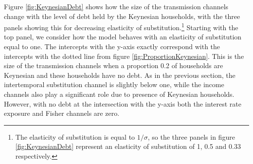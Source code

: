 \documentclass[12pt,a4paper]{article}
\begin{document}
Figure \ref{fig:KeynesianDebt} shows how the size of the transmission channels change with the level of debt held by the Keynesian households, with the three panels showing this for decreasing elasticity of substitution.\footnote{The elasticity of substitution is equal to $1/\sigma$, so the three panels in figure \ref{fig:KeynesianDebt} represent an elasticity of substitution of 1, 0.5 and 0.33 respectively.} Starting with the top panel, we consider how the model behaves with an elasticity of substitution equal to one. The intercepts with the y-axis exactly correspond with the intercepts with the dotted line from figure \ref{fig:ProportionKeynesian}. This is the size of the transmission channels when a proportion 0.2 of households are Keynesian and these households have no debt. As in the previous section, the intertemporal substitution channel is slightly below one, while the income channels also play a significant role due to presence of Keynesian households. However, with no debt at the intersection with the y-axis both the interest rate exposure and Fisher channels are zero.
\end{document}
